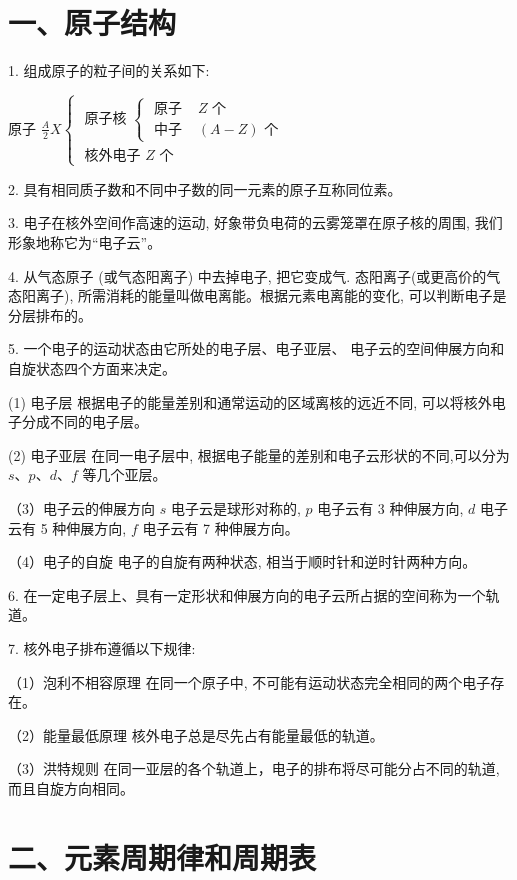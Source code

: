 \documentclass[10pt]{article}
\begin{document}
\section*{一、原子结构}

1. 组成原子的粒子间的关系如下:

原子 \(\frac{A}{2}X\left\{ \begin{array}{l} \text{ 原子核 }\left\{ \begin{array}{ll} \text{ 原子 } & Z\text{ 个 } \\ \text{ 中子 } & \left( {A - Z}\right) \text{ 个 } \end{array}\right. \\ \text{ 核外电子 }Z\text{ 个 } \end{array}\right.\)

2. 具有相同质子数和不同中子数的同一元素的原子互称同位素。

3. 电子在核外空间作高速的运动, 好象带负电荷的云雾笼罩在原子核的周围, 我们形象地称它为“电子云”。

4. 从气态原子 (或气态阳离子) 中去掉电子, 把它变成气. 态阳离子(或更高价的气态阳离子), 所需消耗的能量叫做电离能。根据元素电离能的变化, 可以判断电子是分层排布的。

5. 一个电子的运动状态由它所处的电子层、电子亚层、 电子云的空间伸展方向和自旋状态四个方面来决定。

(1) 电子层 根据电子的能量差别和通常运动的区域离核的远近不同, 可以将核外电子分成不同的电子层。

(2) 电子亚层 在同一电子层中, 根据电子能量的差别和电子云形状的不同,可以分为 \(s\text{、}p\text{、}d\text{、}f\) 等几个亚层。

（3）电子云的伸展方向 \(s\) 电子云是球形对称的, \(p\) 电子云有 3 种伸展方向, \(d\) 电子云有 5 种伸展方向, \(f\) 电子云有 7 种伸展方向。

（4）电子的自旋 电子的自旋有两种状态, 相当于顺时针和逆时针两种方向。

6. 在一定电子层上、具有一定形状和伸展方向的电子云所占据的空间称为一个轨道。

7. 核外电子排布遵循以下规律:

（1）泡利不相容原理 在同一个原子中, 不可能有运动状态完全相同的两个电子存在。

（2）能量最低原理 核外电子总是尽先占有能量最低的轨道。

（3）洪特规则 在同一亚层的各个轨道上，电子的排布将尽可能分占不同的轨道, 而且自旋方向相同。

\section*{二、元素周期律和周期表}
\end{document}
